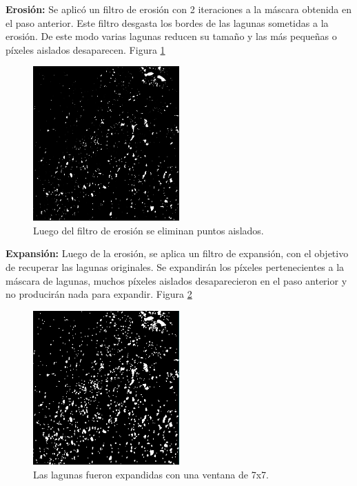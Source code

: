 \documentclass[10pt,a4paper, twoside]{report}
\begin{document}
		\textbf{Erosión:} Se aplicó un filtro de erosión con 2 iteraciones a la máscara obtenida en el paso anterior. Este filtro desgasta los bordes de las lagunas sometidas a la erosión. De este modo varias lagunas reducen su tamaño y las más pequeñas o píxeles aislados desaparecen. Figura \ref{puntosAislados}
		
\begin{figure}[H]
   \centering      
   \includegraphics[width=0.5\textwidth]{imagenes/puntosAislados.jpg}
 \caption{Luego del filtro de erosión se eliminan puntos aislados.}
 \label{puntosAislados}
\end{figure}		

		\textbf{Expansión:} Luego de la erosión, se aplica un filtro de expansión, con el objetivo de recuperar las lagunas originales. Se expandirán los píxeles pertenecientes a la máscara de lagunas, muchos píxeles aislados desaparecieron en el paso anterior y no producirán nada para expandir. Figura \ref{lagunasExpandidas}
		
\begin{figure}[H]
   \centering      
   \includegraphics[width=0.5\textwidth]{imagenes/lagunasExpandidas.jpg}
 \caption{Las lagunas fueron expandidas con una ventana de 7x7.}
 \label{lagunasExpandidas}
\end{figure}
		
\end{document}
